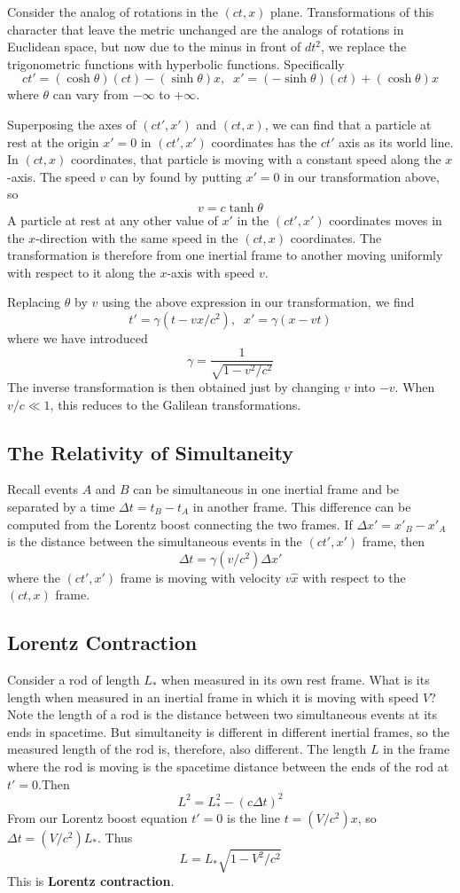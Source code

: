 Consider the analog of rotations in the $(ct,x)$ plane. Transformations of this character that leave the metric unchanged are the analogs of rotations in Euclidean space, but now due to the minus in front of $dt^2$, we replace the trigonometric functions with hyperbolic functions. Specifically $$ct' = (\cosh\theta)(ct)-(\sinh\theta)x,\;\;x' = (-\sinh\theta)(ct)+(\cosh\theta)x$$
where $\theta$ can vary from $-\infty$ to $+\infty$.

Superposing the axes of $(ct',x')$ and $(ct,x)$, we can find that a particle at rest at the origin $x' = 0$ in $(ct',x')$ coordinates has the $ct'$ axis as its world line. In $(ct,x)$ coordinates, that particle is moving with a constant speed along the $x$-axis. The speed $v$ can by found by putting $x' = 0$ in our transformation above, so $$v = c\tanh\theta$$
A particle at rest at any other value of $x'$ in the $(ct',x')$ coordinates moves in the $x$-direction with the same speed in the $(ct,x)$ coordinates. The transformation is therefore from one inertial frame to another moving uniformly with respect to it along the $x$-axis with speed $v$.

Replacing $\theta$ by $v$ using the above expression in our transformation, we find $$t' = \gamma(t-vx/c^2),\;\;x' = \gamma(x-vt)$$
where we have introduced $$\gamma = \frac{1}{\sqrt{1-v^2/c^2}}$$
The inverse transformation is then obtained just by changing $v$ into $-v$. When $v/c \ll 1$, this reduces to the Galilean transformations.


\subsection{The Relativity of Simultaneity}

Recall events $A$ and $B$ can be simultaneous in one inertial frame and be separated by a time $\Delta t = t_B-t_A$ in another frame. This difference can be computed from the Lorentz boost connecting the two frames. If $\Delta x' = x'_B - x'_A$ is the distance between the simultaneous events in the $(ct',x')$ frame, then $$\Delta t = \gamma(v/c^2)\Delta x'$$
where the $(ct',x')$ frame is moving with velocity $v\hat{x}$ with respect to the $(ct,x)$ frame.


\subsection{Lorentz Contraction}

Consider a rod of length $L_*$ when measured in its own rest frame. What is its length when measured in an inertial frame in which it is moving with speed $V$? Note the length of a rod is the distance between two simultaneous events at its ends in spacetime. But simultaneity is different in different inertial frames, so the measured length of the rod is, therefore, also different. The length $L$ in the frame where the rod is moving is the spacetime distance between the ends of the rod at $t' = 0$.Then $$L^2 = L_*^2 - (c\Delta t)^2$$
From our Lorentz boost equation $t' = 0$ is the line $t = (V/c^2)x$, so $\Delta t = (V/c^2)L_*$. Thus \begin{equation}
    \boxed{L = L_*\sqrt{1-V^2/c^2}}
\end{equation}
This is \textbf{Lorentz contraction}.


